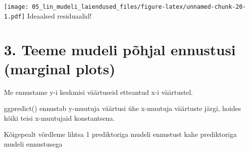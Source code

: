 \documentclass[]{book}
\begin{document}
\texttt{[image: 05\_lin\_mudeli\_laiendused\_files/figure-latex/unnamed-chunk-20-1.pdf]}
Ideaalsed residuaalid!

\section*{3. Teeme mudeli põhjal ennustusi (marginal
plots)}\label{teeme-mudeli-pohjal-ennustusi-marginal-plots}

Me ennustame y-i keskmisi väärtuseid etteantud x-i väärtustel.

ggpredict() ennustab y-muutuja väärtusi ühe x-muutuja väärtuste järgi,
hoides kõiki teisi x-muutujaid konstantsena.

Kõigepealt võrdleme lihtsa 1 prediktoriga mudeli ennustust kahe
prediktoriga mudeli ennustusega
\end{document}

